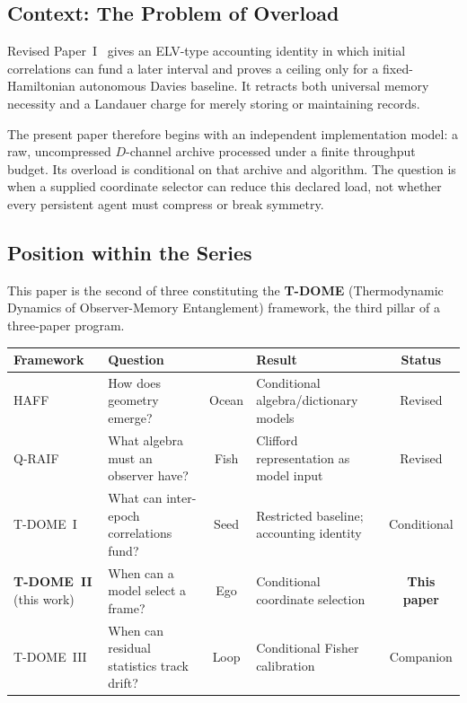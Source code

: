 \documentclass[12pt]{article}
\begin{document}
\subsection{Context: The Problem of Overload}
\label{subsec:overload}

Revised Paper~I~\cite{Liu2026TDOME_I} gives an ELV-type
accounting identity in which initial correlations can fund a later
interval and proves a ceiling only for a fixed-Hamiltonian autonomous
Davies baseline.  It retracts both universal memory necessity and a
Landauer charge for merely storing or maintaining records.

The present paper therefore begins with an independent implementation
model: a raw, uncompressed $D$-channel archive processed under a finite
throughput budget.  Its overload is conditional on that archive and
algorithm.  The question is when a supplied coordinate selector can
reduce this declared load, not whether every persistent agent must
compress or break symmetry.

\subsection{Position within the Series}
\label{subsec:series_position}

This paper is the second of three constituting the
\textbf{T-DOME} (Thermodynamic Dynamics of Observer-Memory
Entanglement) framework, the third pillar of a three-paper
program.

\begin{center}
\small
\setlength{\tabcolsep}{4pt}%
\begin{tabular}{@{}lP{3.2cm}cP{3.4cm}c@{}}
\toprule
\textbf{Framework} & \textbf{Question} & & \textbf{Result}
  & \textbf{Status} \\
\midrule
HAFF~\cite{Liu2026HAFF_A,Liu2026HAFF_B}
  & How does geometry emerge?
  & Ocean
  & Conditional algebra/dictionary models
  & Revised \\[3pt]
Q-RAIF~\cite{Liu2026QRAIF_A,Liu2026QRAIF_B}
  & What algebra must an observer have?
  & Fish
  & Clifford representation as model input
  & Revised \\[3pt]
T-DOME~I~\cite{Liu2026TDOME_I}
  & What can inter-epoch correlations fund?
  & Seed
  & Restricted baseline; accounting identity
  & Conditional \\[3pt]
\textbf{T-DOME~II} (this work)
  & When can a model select a frame?
  & Ego
  & Conditional coordinate selection
  & \textbf{This paper} \\[3pt]
T-DOME~III
  & When can residual statistics track drift?
  & Loop
  & Conditional Fisher calibration
  & Companion \\
\bottomrule
\end{tabular}
\end{center}
\end{document}
